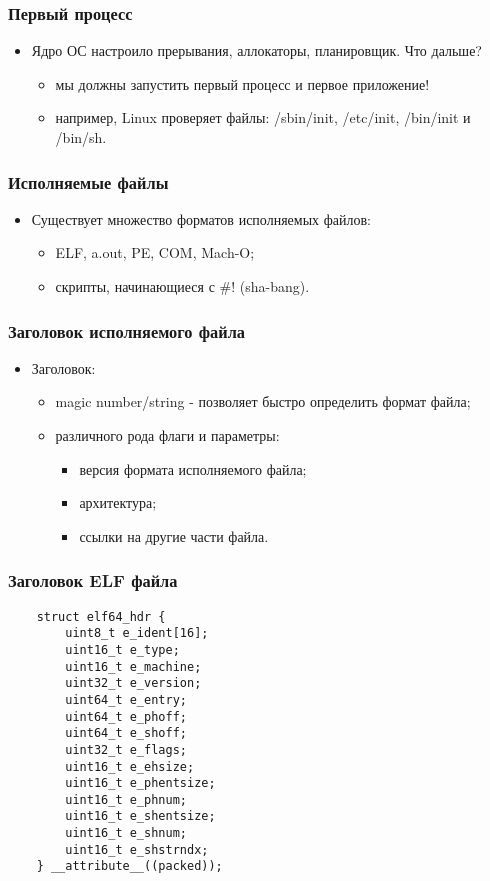 \begin{frame}
\frametitle{Первый процесс}
\begin{itemize}
    \item<1->Ядро ОС настроило прерывания, аллокаторы, планировщик. Что дальше?
    \begin{itemize}
        \item<2->мы должны запустить первый процесс и первое приложение!
        \item<3->например, Linux проверяет файлы: /sbin/init, /etc/init,
             /bin/init и /bin/sh.
    \end{itemize}
\end{itemize}
\end{frame}

\begin{frame}
\frametitle{Исполняемые файлы}
\begin{itemize}
    \item<1->Существует множество форматов исполняемых файлов:
    \begin{itemize}
        \item<2->ELF, a.out, PE, COM, Mach-O;
        \item<3->скрипты, начинающиеся с \#! (sha-bang).
    \end{itemize}
\end{itemize}
\end{frame}

\begin{frame}
\frametitle{Заголовок исполняемого файла}
\begin{itemize}
    \item<1->Заголовок:
    \begin{itemize}
        \item<2->magic number/string - позволяет быстро определить формат файла;
        \item<3->различного рода флаги и параметры:
        \begin{itemize}
            \item<4->версия формата исполняемого файла;
            \item<5->архитектура;
            \item<6->ссылки на другие части файла.
        \end{itemize}
    \end{itemize}
\end{itemize}
\end{frame}

\begin{frame}[fragile]
\frametitle{Заголовок ELF файла}
\begin{lstlisting}
    struct elf64_hdr {
        uint8_t e_ident[16];
        uint16_t e_type;
        uint16_t e_machine;
        uint32_t e_version;
        uint64_t e_entry;
        uint64_t e_phoff;
        uint64_t e_shoff;
        uint32_t e_flags;
        uint16_t e_ehsize;
        uint16_t e_phentsize;
        uint16_t e_phnum;
        uint16_t e_shentsize;
        uint16_t e_shnum;
        uint16_t e_shstrndx;
    } __attribute__((packed));
\end{lstlisting}
\end{frame}

